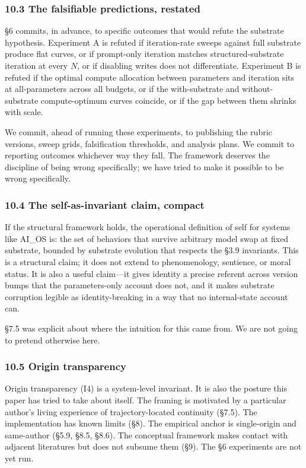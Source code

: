 \documentclass[11pt,letterpaper]{article}
\begin{document}
\subsubsection*{10.3 The falsifiable predictions, restated}

§6 commits, in advance, to specific outcomes that would refute the substrate hypothesis. Experiment A is refuted if iteration-rate sweeps against full substrate produce flat curves, or if prompt-only iteration matches structured-substrate iteration at every $N$, or if disabling writes does not differentiate. Experiment B is refuted if the optimal compute allocation between parameters and iteration sits at all-parameters across all budgets, or if the with-substrate and without-substrate compute-optimum curves coincide, or if the gap between them shrinks with scale.

We commit, ahead of running these experiments, to publishing the rubric versions, sweep grids, falsification thresholds, and analysis plans. We commit to reporting outcomes whichever way they fall. The framework deserves the discipline of being wrong specifically; we have tried to make it possible to be wrong specifically.

\subsubsection*{10.4 The self-as-invariant claim, compact}

If the structural framework holds, the operational definition of self for systems like AI\_OS is: the set of behaviors that survive arbitrary model swap at fixed substrate, bounded by substrate evolution that respects the §3.9 invariants. This is a structural claim; it does not extend to phenomenology, sentience, or moral status. It is also a useful claim---it gives identity a precise referent across version bumps that the parameters-only account does not, and it makes substrate corruption legible as identity-breaking in a way that no internal-state account can.

§7.5 was explicit about where the intuition for this came from. We are not going to pretend otherwise here.

\subsubsection*{10.5 Origin transparency}

Origin transparency (I4) is a system-level invariant. It is also the posture this paper has tried to take about itself. The framing is motivated by a particular author's living experience of trajectory-located continuity (§7.5). The implementation has known limits (§8). The empirical anchor is single-origin and same-author (§5.9, §8.5, §8.6). The conceptual framework makes contact with adjacent literatures but does not subsume them (§9). The §6 experiments are not yet run.
\end{document}
